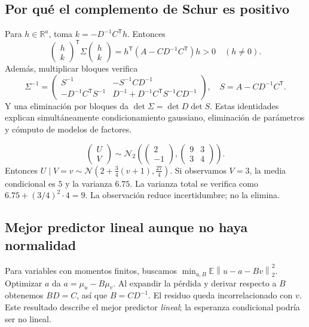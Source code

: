 \documentclass[11pt,a4paper]{article}
\newcommand{\R}{\mathbb R}
\newcommand{\E}{\mathbb E}
\newcommand{\T}{^{\mathsf T}}
\newcommand{\norm}[1]{\left\lVert #1\right\rVert}
\theoremstyle{definition}
\begin{document}
\subsection{Por qué el complemento de Schur es positivo}
Para $h\in\R^a$, toma $k=-D^{-1}C\T h$. Entonces
\[
\begin{pmatrix}h\\k\end{pmatrix}\T\Sigma\begin{pmatrix}h\\k\end{pmatrix}
=h\T(A-CD^{-1}C\T)h>0\quad(h\ne0).
\]
Además, multiplicar bloques verifica
\[
\Sigma^{-1}=\begin{pmatrix}
S^{-1}&-S^{-1}CD^{-1}\\
-D^{-1}C\T S^{-1}&D^{-1}+D^{-1}C\T S^{-1}CD^{-1}
\end{pmatrix},\quad S=A-CD^{-1}C\T.
\]
Y una eliminación por bloques da $\det\Sigma=\det D\det S$. Estas identidades explican simultáneamente condicionamiento gaussiano, eliminación de parámetros y cómputo de modelos de factores.
\begin{ejemplo}
\[
\begin{pmatrix}U\\V\end{pmatrix}\sim\mathcal N_2\!\left(
\begin{pmatrix}2\\-1\end{pmatrix},
\begin{pmatrix}9&3\\3&4\end{pmatrix}\right).
\]
Entonces $U\mid V=v\sim\mathcal N(2+\tfrac34(v+1),\tfrac{27}4)$. Si observamos $V=3$, la media condicional es $5$ y la varianza $6.75$. La varianza total se verifica como $6.75+(3/4)^2\cdot4=9$. La observación reduce incertidumbre; no la elimina.
\end{ejemplo}
\subsection{Mejor predictor lineal aunque no haya normalidad}
Para variables con momentos finitos, buscamos $\min_{a,B}\E\norm{u-a-Bv}_2^2$. Optimizar $a$ da $a=\mu_u-B\mu_v$. Al expandir la pérdida y derivar respecto a $B$ obtenemos $BD=C$, así que $B=CD^{-1}$. El residuo queda incorrelacionado con $v$. Este resultado describe el mejor predictor \emph{lineal}; la esperanza condicional podría ser no lineal.
\end{document}
